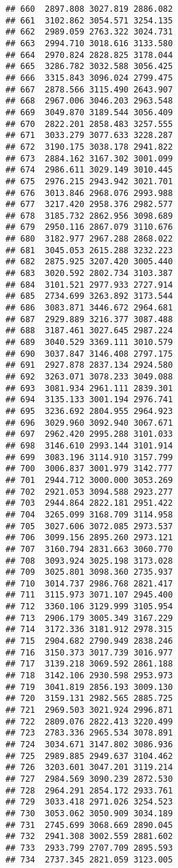\documentclass[
]{article}
\begin{document}
\begin{verbatim}
## 660  2897.808 3027.819 2886.082
## 661  3102.862 3054.571 3254.135
## 662  2989.059 2763.322 3024.731
## 663  2994.710 3018.616 3133.580
## 664  2970.824 2828.825 3178.044
## 665  3286.782 3032.588 3056.425
## 666  3315.843 3096.024 2799.475
## 667  2878.566 3115.490 2643.907
## 668  2967.006 3046.203 2963.548
## 669  3049.870 3189.544 3056.409
## 670  2822.201 2858.483 3257.555
## 671  3033.279 3077.633 3228.287
## 672  3190.175 3038.178 2941.822
## 673  2884.162 3167.302 3001.099
## 674  2986.611 3029.149 3010.445
## 675  2976.215 2943.942 3021.701
## 676  3013.846 2968.076 2993.988
## 677  3217.420 2958.376 2982.577
## 678  3185.732 2862.956 3098.689
## 679  2950.116 2867.079 3110.676
## 680  3182.977 2967.288 2868.022
## 681  3045.053 2615.288 3232.223
## 682  2875.925 3207.420 3005.440
## 683  3020.592 2802.734 3103.387
## 684  3101.521 2977.933 2727.914
## 685  2734.699 3263.892 3173.544
## 686  3083.871 3446.672 2964.681
## 687  2929.889 3216.377 3087.488
## 688  3187.461 3027.645 2987.224
## 689  3040.529 3369.111 3010.579
## 690  3037.847 3146.408 2797.175
## 691  2927.878 2837.134 2924.580
## 692  3263.071 3078.233 3049.088
## 693  3081.934 2961.111 2839.301
## 694  3135.133 3001.194 2976.741
## 695  3236.692 2804.955 2964.923
## 696  3029.960 3092.940 3067.671
## 697  2962.420 2995.288 3101.033
## 698  3146.610 2993.144 3101.914
## 699  3083.196 3114.910 3157.799
## 700  3006.837 3001.979 3142.777
## 701  2944.712 3000.000 3053.269
## 702  2921.053 3094.588 2923.277
## 703  2944.864 2822.181 2951.422
## 704  3265.099 3168.709 3114.958
## 705  3027.606 3072.085 2973.537
## 706  3099.156 2895.260 2973.121
## 707  3160.794 2831.663 3060.770
## 708  3093.924 3025.198 3173.028
## 709  3025.801 3098.360 2735.937
## 710  3014.737 2986.768 2821.417
## 711  3115.973 3071.107 2945.400
## 712  3360.106 3129.999 3105.954
## 713  2906.179 3005.349 3167.229
## 714  3172.336 3181.912 2978.315
## 715  2904.682 2790.949 2838.246
## 716  3150.373 3017.739 3016.977
## 717  3139.218 3069.592 2861.188
## 718  3142.106 2930.598 2953.973
## 719  3041.819 2856.193 3009.130
## 720  3159.131 2982.565 2885.725
## 721  2969.503 3021.924 2996.871
## 722  2809.076 2822.413 3220.499
## 723  2783.336 2965.534 3078.891
## 724  3034.671 3147.802 3086.936
## 725  2989.885 2949.637 3104.462
## 726  3203.601 3047.201 3119.214
## 727  2984.569 3090.239 2872.530
## 728  2964.291 2854.172 2933.761
## 729  3033.418 2971.026 3254.523
## 730  3053.062 3050.909 3034.189
## 731  2745.699 3068.669 2890.045
## 732  2941.308 3002.559 2881.602
## 733  2933.799 2707.709 2895.593
## 734  2737.345 2821.059 3123.005

\end{verbatim}
\end{document}
